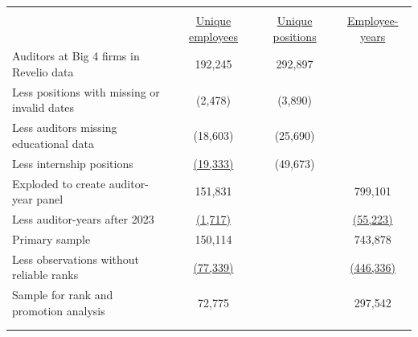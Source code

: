\begin{tabular}{ l c c c}
\\[-1.8ex]\hline \hline \\[-1.8ex]
 & \underline{Unique employees} & \underline{Unique positions} & \underline{Employee-years} \\
Auditors at Big 4 firms in Revelio data & 192,245 & 292,897 & \\
\quad Less positions with missing or invalid dates & (2,478) & (3,890) & \\
\quad Less auditors missing educational data & (18,603) & (25,690) & \\
\quad Less internship positions & \underline{(19,333)} & (49,673) & \\
Exploded to create auditor-year panel & 151,831 & & 799,101 \\
\quad Less auditor-years after 2023 & \underline{(1,717)} & & \underline{(55,223)} \\
Primary sample & 150,114 & & 743,878 \\
\quad Less observations without reliable ranks & \underline{(77,339)} & & \underline{(446,336)} \\
Sample for rank and promotion analysis & 72,775 & & 297,542 \\
\\[-1.8ex]\hline \hline \\[-1.8ex]
\end{tabular}